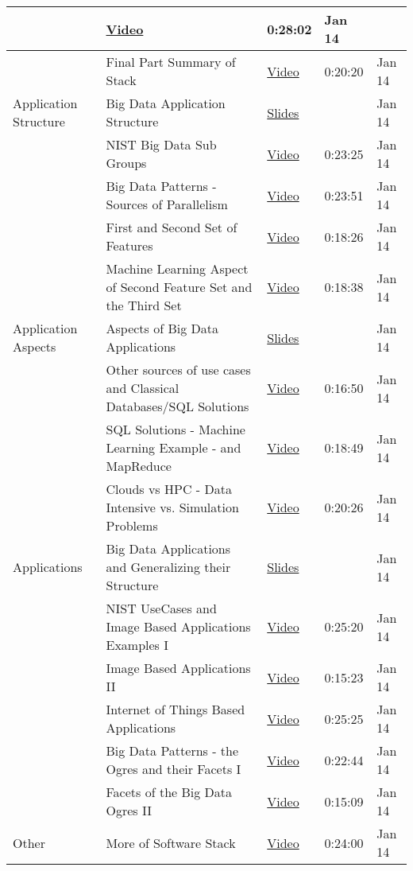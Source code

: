 \begin{longtable}{|*{5}{p{}|}}
\begin{enumerate}
\end{enumerate}
&
\href{https://www.youtube.com/watch?v=13EQZ-6z91k}{Video}
&
0:28:02
&
Jan 14
\\
\hline&
Final Part Summary of Stack
&
\href{https://www.youtube.com/watch?v=0kj-NEl8VF4}{Video}
&
0:20:20
&
Jan 14
\\
\hline
Application Structure
&
Big Data Application Structure
&
\href{https://iu.box.com/s/zl71trvqfw6vv4wnc8xr6gf1qpc9a2dr}{Slides}
&&
Jan 14
\\
\hline&
NIST Big Data Sub Groups
&
\href{https://www.youtube.com/watch?v=12-BlQhnCxc}{Video}
&
0:23:25
&
Jan 14
\\
\hline&
Big Data Patterns - Sources of Parallelism
&
\href{https://www.youtube.com/watch?v=tZfFQw5M8cU}{Video}
&
0:23:51
&
Jan 14
\\
\hline&
First and Second Set of Features
&
\href{https://www.youtube.com/watch?v=PgUGXql34DM}{Video}
&
0:18:26
&
Jan 14
\\
\hline&
Machine Learning Aspect of Second Feature Set and the Third Set
&
\href{https://www.youtube.com/watch?v=mNmmW5ZBjgs}{Video}
&
0:18:38
&
Jan 14
\\
\hline
Application Aspects
&
Aspects of Big Data Applications
&
\href{https://iu.box.com/s/atgkxucop1lzftkunf8al2fe74x65na6}{Slides}
&&
Jan 14
\\
\hline&
Other sources of use cases and Classical Databases/SQL Solutions
&
\href{https://youtu.be/dZRtHaf2MyA}{Video}
&
0:16:50
&
Jan 14
\\
\hline&
SQL Solutions -  Machine Learning Example -  and MapReduce
&
\href{https://www.youtube.com/watch?v=PZDiJNS234A}{Video}
&
0:18:49
&
Jan 14
\\
\hline&
Clouds vs HPC -  Data Intensive vs. Simulation Problems
&
\href{https://www.youtube.com/watch?v=gazESBGLlY8}{Video}
&
0:20:26
&
Jan 14
\\
\hline
Applications
&
Big Data Applications and Generalizing their Structure
&
\href{https://iu.box.com/s/01dndtucmynekgehur00vktfgcppgc1r}{Slides}
&&
Jan 14
\\
\hline&
NIST UseCases and Image Based Applications Examples I
&
\href{https://www.youtube.com/watch?v=tRoAx444A6U}{Video}
&
0:25:20
&
Jan 14
\\
\hline&
Image Based Applications II
&
\href{https://www.youtube.com/watch?v=FDtnWGwotjA}{Video}
&
0:15:23
&
Jan 14
\\
\hline&
Internet of Things Based Applications
&
\href{https://www.youtube.com/watch?v=cOuCSveoVYY}{Video}
&
0:25:25
&
Jan 14
\\
\hline&
Big Data Patterns - the Ogres and their Facets I
&
\href{https://www.youtube.com/watch?v=CvCfRP7J6dU}{Video}
&
0:22:44
&
Jan 14
\\
\hline&
Facets of the Big Data Ogres II
&
\href{https://www.youtube.com/watch?v=fGyUPApnwHw}{Video}
&
0:15:09
&
Jan 14
\\
\hline
Other
&
More of Software Stack
&
\href{https://www.youtube.com/watch?v=apDXH\_eVnEc}{Video}
&
0:24:00
&
Jan 14
\\
\hline\end{longtable}
